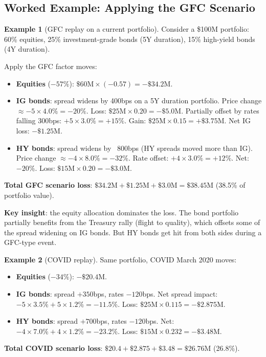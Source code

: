 \documentclass[11pt, a4paper]{article}
\theoremstyle{definition}
\newtheorem{example}{Example}[section]
\theoremstyle{plain}
\theoremstyle{remark}
\begin{document}
\subsection{Worked Example: Applying the GFC Scenario}

\begin{example}[GFC replay on a current portfolio]\label{ex:gfc-replay}
Consider a \$100M portfolio: 60\% equities, 25\% investment-grade bonds (5Y duration),
15\% high-yield bonds (4Y duration).

Apply the GFC factor moves:
\begin{itemize}
    \item \textbf{Equities} ($-57\%$): $\$60\text{M} \times (-0.57) = -\$34.2\text{M}$.
    \item \textbf{IG bonds}: spread widens by 400bps on a 5Y duration portfolio.
          Price change $\approx -5 \times 4.0\% = -20\%$.
          Loss: $\$25\text{M} \times 0.20 = -\$5.0\text{M}$.
          Partially offset by rates falling 300bps: $+5 \times 3.0\% = +15\%$.
          Gain: $\$25\text{M} \times 0.15 = +\$3.75\text{M}$.
          Net IG loss: $-\$1.25\text{M}$.
    \item \textbf{HY bonds}: spread widens by ~800bps (HY spreads moved more than IG).
          Price change $\approx -4 \times 8.0\% = -32\%$.
          Rate offset: $+4 \times 3.0\% = +12\%$.
          Net: $-20\%$. Loss: $\$15\text{M} \times 0.20 = -\$3.0\text{M}$.
\end{itemize}

\textbf{Total GFC scenario loss}: $\$34.2\text{M} + \$1.25\text{M} + \$3.0\text{M} = \$38.45\text{M}$
(38.5\% of portfolio value).

\textbf{Key insight}: the equity allocation dominates the loss.
The bond portfolio partially benefits from the Treasury rally (flight to quality),
which offsets some of the spread widening on IG bonds.
But HY bonds get hit from both sides during a GFC-type event.
\end{example}

\begin{example}[COVID replay]\label{ex:covid-replay}
Same portfolio, COVID March 2020 moves:
\begin{itemize}
    \item \textbf{Equities} ($-34\%$): $-\$20.4\text{M}$.
    \item \textbf{IG bonds}: spread $+350$bps, rates $-120$bps.
          Net spread impact: $-5 \times 3.5\% + 5 \times 1.2\% = -11.5\%$.
          Loss: $\$25\text{M} \times 0.115 = -\$2.875\text{M}$.
    \item \textbf{HY bonds}: spread $+700$bps, rates $-120$bps.
          Net: $-4 \times 7.0\% + 4 \times 1.2\% = -23.2\%$.
          Loss: $\$15\text{M} \times 0.232 = -\$3.48\text{M}$.
\end{itemize}

\textbf{Total COVID scenario loss}: $\$20.4 + \$2.875 + \$3.48 = \$26.76\text{M}$ (26.8\%).
\end{example}
\end{document}
